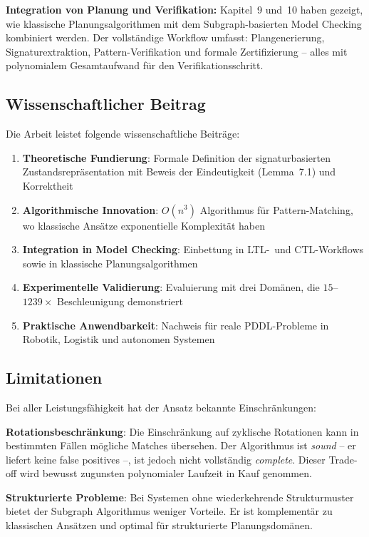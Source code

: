 ﻿\documentclass[a4paper,12pt]{article}
\theoremstyle{definition}
\begin{document}
\textbf{Integration von Planung und Verifikation:} Kapitel~9 und~10 haben gezeigt, wie klassische Planungsalgorithmen mit dem Subgraph-basierten Model Checking kombiniert werden. Der vollständige Workflow umfasst: Plangenerierung, Signaturextraktion, Pattern-Verifikation und formale Zertifizierung -- alles mit polynomialem Gesamtaufwand für den Verifikationsschritt.

\subsection{Wissenschaftlicher Beitrag}

Die Arbeit leistet folgende wissenschaftliche Beiträge:

\begin{enumerate}
	\item \textbf{Theoretische Fundierung}: Formale Definition der signaturbasierten Zustandsrepräsentation mit Beweis der Eindeutigkeit (Lemma~7.1) und Korrektheit
	\item \textbf{Algorithmische Innovation}: $O(n^3)$ Algorithmus für Pattern-Matching, wo klassische Ansätze exponentielle Komplexität haben
	\item \textbf{Integration in Model Checking}: Einbettung in LTL-~und CTL-Workflows
	      sowie in klassische Planungsalgorithmen
	\item \textbf{Experimentelle Validierung}: Evaluierung mit drei Domänen,
	      die $15$--$1239\times$ Beschleunigung demonstriert
	\item \textbf{Praktische Anwendbarkeit}: Nachweis für reale
	      PDDL-Probleme in Robotik, Logistik und autonomen Systemen
\end{enumerate}

\subsection{Limitationen}

Bei aller Leistungsfähigkeit hat der Ansatz bekannte Einschränkungen:

\textbf{Rotationsbeschränkung}: Die Einschränkung auf zyklische Rotationen kann in bestimmten Fällen mögliche Matches übersehen. Der Algorithmus ist \textit{sound} -- er liefert keine false positives --, ist jedoch nicht vollständig \textit{complete}. Dieser Trade-off wird bewusst zugunsten polynomialer Laufzeit in Kauf genommen.

\textbf{Strukturierte Probleme}: Bei Systemen ohne wiederkehrende Strukturmuster bietet der Subgraph Algorithmus weniger Vorteile. Er ist komplementär zu klassischen Ansätzen und optimal für strukturierte Planungsdomänen.
\end{document}

